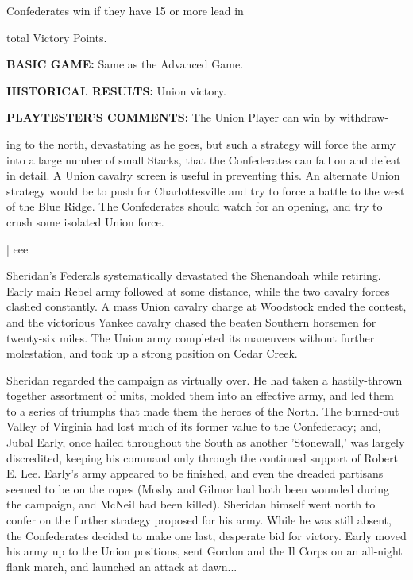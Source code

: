\begin{scenariodata}
Confederates win if they have 15 or more lead in\\
\end{scenariodata}

total Victory Points.

\begin{scenariodata}
\textbf{BASIC GAME:} Same as the Advanced Game.\\
\end{scenariodata}

\begin{scenariodata}
\textbf{HISTORICAL RESULTS:} Union victory.\\
\end{scenariodata}

\begin{scenariodata}
\textbf{PLAYTESTER'S COMMENTS:} The Union Player can win by withdraw-\\
\end{scenariodata}

ing to the north, devastating as he goes, but such a strategy will force the army into a large number of small Stacks, that the Confederates can fall on and defeat in detail. A Union cavalry screen is useful in preventing this. An alternate Union strategy would be to push for Charlottesville and try to force a battle to the west of the Blue Ridge. The Confederates should watch for an opening, and try to crush some isolated Union force.

| eee |

Sheridan's Federals systematically devastated the Shenandoah while retiring. Early main Rebel army followed at some distance, while the two cavalry forces clashed constantly. A mass Union cavalry charge at Woodstock ended the contest, and the victorious Yankee cavalry chased the beaten Southern horsemen for twenty-six miles. The Union army completed its maneuvers without further molestation, and took up a strong position on Cedar Creek.

Sheridan regarded the campaign as virtually over. He had taken a hastily-thrown together assortment of units, molded them into an effective army, and led them to a series of triumphs that made them the heroes of the North. The burned-out Valley of Virginia had lost much of its former value to the Confederacy; and, Jubal Early, once hailed throughout the South as another 'Stonewall,' was largely discredited, keeping his command only through the continued support of Robert E. Lee. Early's army appeared to be finished, and even the dreaded partisans seemed to be on the ropes (Mosby and Gilmor had both been wounded during the campaign, and McNeil had been killed). Sheridan himself went north to confer on the further strategy proposed for his army. While he was still absent, the Confederates decided to make one last, desperate bid for victory. Early moved his army up to the Union positions, sent Gordon and the Il Corps on an all-night flank march, and launched an attack at dawn...

